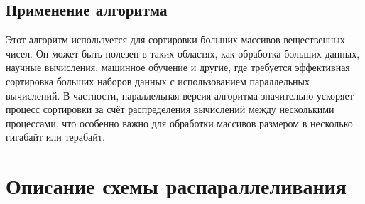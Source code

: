 \documentclass[12pt]{article}
\begin{document}
	\subsection*{Применение алгоритма} Этот алгоритм используется для сортировки больших массивов вещественных чисел. Он может быть полезен в таких областях, как обработка больших данных, научные вычисления, машинное обучение и другие, где требуется эффективная сортировка больших наборов данных с использованием параллельных вычислений. В частности, параллельная версия алгоритма значительно ускоряет процесс сортировки за счёт распределения вычислений между несколькими процессами, что особенно важно для обработки массивов размером в несколько гигабайт или терабайт.
	
	\newpage
	
	\section*{Описание схемы распараллеливания}
	
\end{document}
